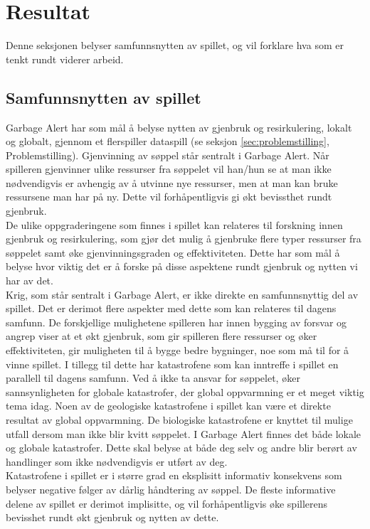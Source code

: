 \section{Resultat}\label{sec:conclusion}
Denne seksjonen belyser samfunnsnytten av spillet, og vil forklare hva
som er tenkt rundt viderer arbeid.
\subsection{Samfunnsnytten av spillet}
Garbage Alert har som mål å belyse nytten av gjenbruk og resirkulering, lokalt og globalt, gjennom et flerspiller dataspill (se seksjon \ref{sec:problemstilling}, Problemstilling).
Gjenvinning av søppel står sentralt i Garbage Alert. Når spilleren gjenvinner ulike ressurser fra søppelet vil han/hun se at man ikke nødvendigvis er avhengig av å utvinne nye ressurser, men at man kan bruke ressursene man har på ny. Dette vil forhåpentligvis gi økt bevissthet rundt gjenbruk. \\

De ulike oppgraderingene som finnes i spillet kan relateres til forskning innen gjenbruk og resirkulering, som gjør det mulig å gjenbruke flere typer ressurser fra søppelet samt øke gjenvinningsgraden og effektiviteten. Dette har som mål å belyse hvor viktig det er å forske på disse aspektene rundt gjenbruk og nytten vi har av det. \\

Krig, som står sentralt i Garbage Alert, er ikke direkte en samfunnsnyttig del av spillet. Det er derimot flere aspekter med dette som kan relateres til dagens samfunn. De forskjellige mulighetene spilleren har innen bygging av forsvar og angrep viser at et økt gjenbruk, som gir spilleren flere ressurser og øker effektiviteten, gir muligheten til å bygge bedre bygninger, noe som må til for å vinne spillet. I tillegg til dette har katastrofene som kan inntreffe i spillet en parallell til dagens samfunn. Ved å ikke ta ansvar for søppelet, øker sannsynligheten for globale katastrofer, der global oppvarmning er et meget viktig tema idag. Noen av de geologiske katastrofene i spillet kan være et direkte resultat av global oppvarmning. De biologiske katastrofene er knyttet til mulige utfall dersom man ikke blir kvitt søppelet. I Garbage Alert finnes det både lokale og globale katastrofer. Dette skal belyse at både deg selv og andre blir berørt av handlinger som ikke nødvendigvis er utført av deg.\\

Katastrofene i spillet er i større grad en eksplisitt informativ konsekvens som belyser negative følger av dårlig håndtering av søppel. De fleste informative delene av spillet er derimot implisitte, og vil forhåpentligvis øke spillerens bevisshet rundt økt gjenbruk og nytten av dette. 

